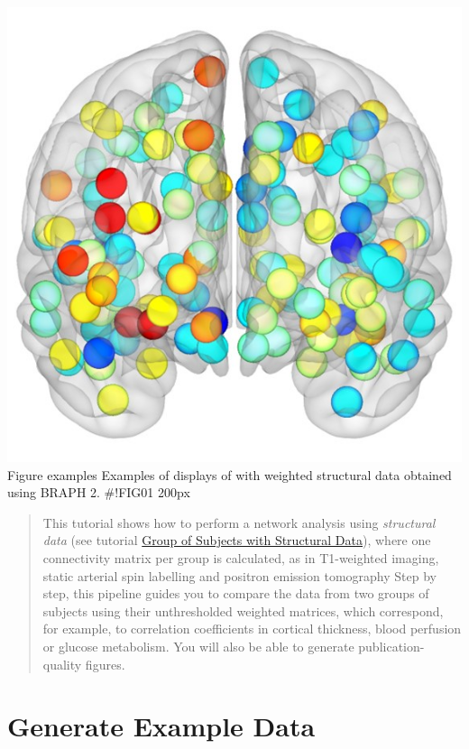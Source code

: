 \documentclass[justified]{tufte-handout}
\begin{document}
{	\includegraphics{fig_01_03.jpg}
}
{Figure examples}
{
	Examples of displays of  with weighted structural data obtained using BRAPH 2.
}
#!FIG01 200px
 
\begin{abstract}
\noindent
This tutorial shows how to perform a network analysis using \emph{structural data} (see tutorial \href{https://github.com/braph-software/BRAPH-2/tree/develop/tutorials/general/tut_gr_st}{Group of Subjects with Structural Data}), where one connectivity matrix per group is calculated, as in T1-weighted imaging, static arterial spin labelling and positron emission tomography Step by step, this pipeline guides you to compare the data from two groups of subjects using their unthresholded weighted matrices, which correspond, for example, to correlation coefficients in cortical thickness, blood perfusion or glucose metabolism. You will also be able to generate publication-quality figures.
\end{abstract}
\tableofcontents


\clearpage

\section{Generate Example Data}
\end{document}
